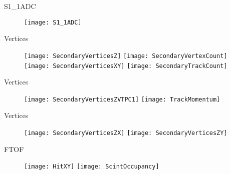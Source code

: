 \documentclass[11pt]{beamer}
\begin{document}
\begin{frame}{S1\_1ADC}
\begin{figure}
\centering
\texttt{[image: S1\_1ADC]}
\end{figure}
\end{frame}

\begin{frame}{Vertices}
\begin{figure}
\centering
\texttt{[image: SecondaryVerticesZ]}
\texttt{[image: SecondaryVertexCount]} \\
\texttt{[image: SecondaryVerticesXY]}
\texttt{[image: SecondaryTrackCount]} \\
\end{figure}
\end{frame}

\begin{frame}{Vertices}
\begin{figure}
\centering
\texttt{[image: SecondaryVerticesZVTPC1]}
\texttt{[image: TrackMomentum]}
\end{figure}
\end{frame}

\begin{frame}{Vertices}
\begin{figure}
\centering
\texttt{[image: SecondaryVerticesZX]}
\texttt{[image: SecondaryVerticesZY]}
\end{figure}
\end{frame}

\begin{frame}{FTOF}
\begin{figure}
\centering
\texttt{[image: HitXY]}
\texttt{[image: ScintOccupancy]}
\end{figure}
\end{frame}
\end{document}
